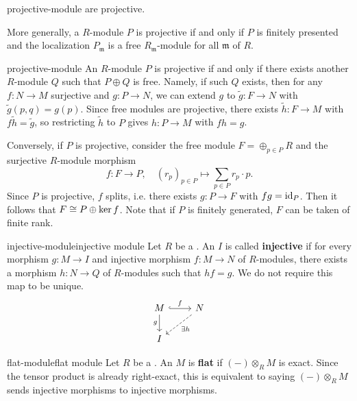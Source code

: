 \begin{example}{projective-module}
     are projective.
    
    More generally, a  $R$-module $P$ is projective if and only if $P$ is finitely presented and the localization $P_\mathfrak{m}$ is a free $R_\mathfrak{m}$-module for all  $\mathfrak{m}$ of $R$.
\end{example}

\begin{example}{projective-module}
    An $R$-module $P$ is projective if and only if there exists another $R$-module $Q$ such that $P \oplus Q$ is free. Namely, if such $Q$ exists, then for any $f : N \to M$ surjective and $g : P \to N$, we can extend $g$ to $\tilde{g} : F \to N$ with $\tilde{g}(p, q) = g(p)$. Since free modules are projective, there exists $\tilde{h} : F \to M$ with $f \tilde{h} = \tilde{g}$, so restricting $\tilde{h}$ to $P$ gives $h : P \to M$ with $fh = g$.
    
    Conversely, if $P$ is projective, consider the free module $F = \oplus_{p \in P} R$ and the surjective $R$-module morphism
    \[ f : F \to P, \quad (r_p)_{p \in P} \mapsto \sum_{p \in P} r_p \cdot p . \]
    Since $P$ is projective, $f$ splits, i.e. there exists $g : P \to F$ with $fg = \textup{id}_P$. Then it follows that $F \cong P \oplus \ker f$. Note that if $P$ is finitely generated, $F$ can be taken of finite rank.
\end{example}

\begin{topic}{injective-module}{injective module}
    Let $R$ be a . An  $I$ is called \textbf{injective} if for every morphism $g : M \to I$ and injective morphism $f : M \to N$ of $R$-modules, there exists a morphism $h : N \to Q$ of $R$-modules such that $hf = g$. We do not require this map to be unique.
    \[ \begin{tikzcd} M \arrow[hookrightarrow]{r}{f} \arrow[swap]{d}{g} & N \arrow[dashed]{ld}{\exists h} \\ I & \end{tikzcd} \]
\end{topic}

\begin{topic}{flat-module}{flat module}
    Let $R$ be a . An  $M$ is \textbf{flat} if $(-) \otimes_R M$ is exact. Since the tensor product is already right-exact, this is equivalent to saying $(-) \otimes_R M$ sends injective morphisms to injective morphisms.
\end{topic}

